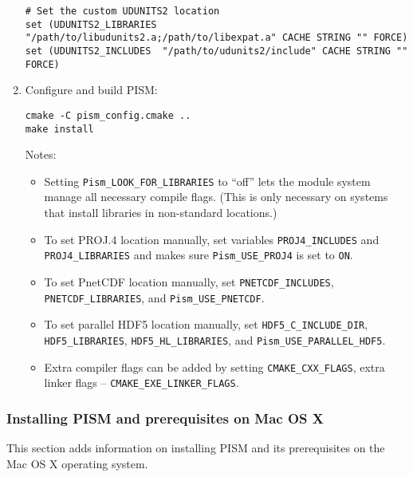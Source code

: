 \documentclass[titlepage,letterpaper,final]{scrartcl}
\begin{document}
\begin{enumerate}
\begin{verbatim}
# Set the custom UDUNITS2 location
set (UDUNITS2_LIBRARIES "/path/to/libudunits2.a;/path/to/libexpat.a" CACHE STRING "" FORCE)
set (UDUNITS2_INCLUDES  "/path/to/udunits2/include" CACHE STRING "" FORCE)
\end{verbatim}
\item Configure and build PISM:
\begin{verbatim}
cmake -C pism_config.cmake ..
make install
\end{verbatim}

Notes:
\begin{itemize}
\item Setting \texttt{Pism_LOOK_FOR_LIBRARIES} to ``off'' lets the module
  system manage all necessary compile flags. (This is only necessary on systems
  that install libraries in non-standard locations.)
\item To set PROJ.4 location manually, set variables
  \texttt{PROJ4_INCLUDES} and \texttt{PROJ4_LIBRARIES} and makes sure
  \texttt{Pism_USE_PROJ4} is set to \texttt{ON}.
\item To set PnetCDF location manually, set \texttt{PNETCDF_INCLUDES},
  \texttt{PNETCDF_LIBRARIES}, and \texttt{Pism_USE_PNETCDF}.
\item To set parallel HDF5 location manually, set
  \texttt{HDF5_C_INCLUDE_DIR}, \texttt{HDF5_LIBRARIES},
  \texttt{HDF5_HL_LIBRARIES}, and \texttt{Pism_USE_PARALLEL_HDF5}.
\item Extra compiler flags can be added by setting \texttt{CMAKE_CXX_FLAGS}, extra linker flags -- \mbox{\texttt{CMAKE_EXE_LINKER_FLAGS}}.
\end{itemize}
\end{enumerate}

\subsubsection{Installing PISM and prerequisites on Mac OS X}  \label{subsec:macosx}

This section adds information on installing PISM and its prerequisites on the Mac OS X operating system.
\end{document}
